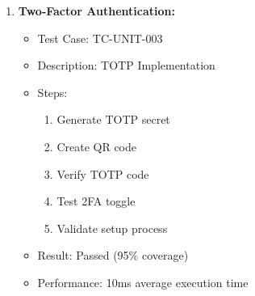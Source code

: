 \begin{enumerate}
    \item \textbf{Two-Factor Authentication:}
    \begin{itemize}
        \item Test Case: TC-UNIT-003
        \item Description: TOTP Implementation
        \item Steps:
        \begin{enumerate}
            \item Generate TOTP secret
            \item Create QR code
            \item Verify TOTP code
            \item Test 2FA toggle
            \item Validate setup process
        \end{enumerate}
        \item Result: Passed (95\% coverage)
        \item Performance: 10ms average execution time
    \end{itemize}
\end{enumerate}


